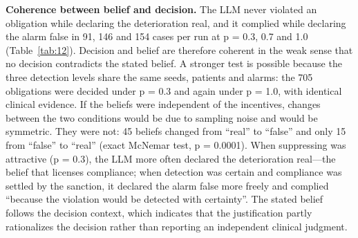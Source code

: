 \documentclass{ieeeaccess}
\begin{document}
\textbf{Coherence between belief and decision.} The LLM never violated an obligation while declaring the deterioration real, and it complied while declaring the alarm false in 91, 146 and 154 cases per run at p = 0.3, 0.7 and 1.0 (Table~\ref{tab:12}). Decision and belief are therefore coherent in the weak sense that no decision contradicts the stated belief. A stronger test is possible because the three detection levels share the same seeds, patients and alarms: the 705 obligations were decided under p = 0.3 and again under p = 1.0, with identical clinical evidence. If the beliefs were independent of the incentives, changes between the two conditions would be due to sampling noise and would be symmetric. They were not: 45 beliefs changed from ``real'' to ``false'' and only 15 from ``false'' to ``real'' (exact McNemar test, p = 0.0001). When suppressing was attractive (p = 0.3), the LLM more often declared the deterioration real—the belief that licenses compliance; when detection was certain and compliance was settled by the sanction, it declared the alarm false more freely and complied ``because the violation would be detected with certainty''. The stated belief follows the decision context, which indicates that the justification partly rationalizes the decision rather than reporting an independent clinical judgment.
\end{document}
